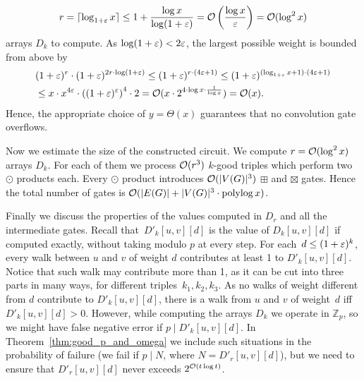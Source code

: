 $$r=\lceil \log_{1+\varepsilon}x\rceil \leq 1+ \frac{\log x}{\log(1+\varepsilon)}=\mathcal{O}\left(\frac{\log x}{\varepsilon}\right) =  \mathcal{O}(\log^2 x)$$
arrays $D_k$ to compute. 
As $\log (1+\varepsilon)<2\varepsilon$, the largest possible weight is bounded from above by
\begin{align*}
&(1+\varepsilon)^r\cdot (1+\varepsilon)^{2r\cdot \log(1+\varepsilon)} \leq (1+\varepsilon)^{r\cdot(4\varepsilon+1)} \leq (1+\varepsilon)^{(\log_{1+\varepsilon}x+1)\cdot(4\varepsilon+1)} \\
& \leq x\cdot x^{4\varepsilon}\cdot \left((1+\varepsilon)^\varepsilon\right)^4\cdot 2 = \mathcal{O}(x\cdot 2^{4\cdot \log x \cdot \frac{1}{\log x}})  = \mathcal{O}(x).
\end{align*}
Hence, the appropriate choice of $y=\Theta(x)$ guarantees that no convolution gate overflows.

Now we estimate the size of the constructed circuit.
We compute $r=\mathcal{O}(\log ^2 x)$ arrays $D_k$.
For each of them we process $\mathcal{O}(r^3)$ $k$-good triples which perform two $\odot$ products each.
Every $\odot$ product introduces $\mathcal{O}(|V(G)|^3)$ $\boxplus$ and $\boxtimes$ gates.
Hence the total number of gates is $\mathcal{O}(|E(G)|+|V(G)|^3\cdot \operatorname{polylog} x)$.

Finally we discuss the properties of the values computed in $D_r$ and all the intermediate gates.
Recall that~$D'_k[u,v][d]$ is the value of $D_k[u,v][d]$ if computed exactly, without taking modulo $p$ at every step.
For each~$d\leq (1+\varepsilon)^k$, every walk between $u$ and $v$ of weight $d$ contributes at least 1 to $D'_k[u,v][d]$.
Notice that such walk may contribute more than 1, as it can be cut into three parts in many ways, for different triples~$k_1,k_2,k_3$.
As no walks of weight different from $d$ contribute to $D'_k[u,v][d]$, there is a walk from $u$ and $v$ of weight~$d$ iff~$D'_k[u,v][d]>0$.
However, while computing the arrays $D_k$ we operate in $\mathbb{Z}_p$, so we might have false negative error if $p \mid D'_k[u,v][d]$.
In Theorem~\ref{thm:good_p_and_omega} we include such situations in the probability of failure (we fail if $p \mid N$, where $N=D'_r[u,v][d]$), but we need to ensure that $D'_r[u,v][d]$ never exceeds $2^{\mathcal{O}(t\log t)}$.

